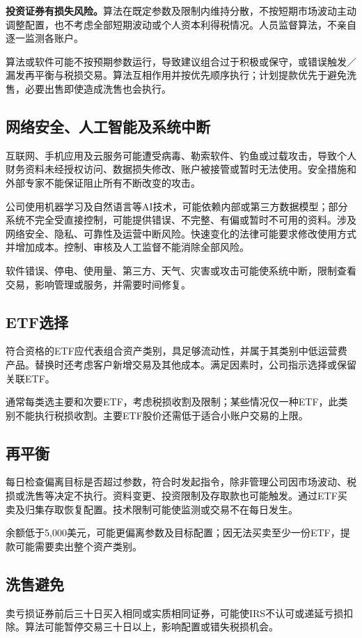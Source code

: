 \documentclass[UTF8,fontset=none,11pt,a4paper]{ctexart}
\begin{document}
\textbf{投资证券有损失风险。}算法在既定参数及限制内维持分散，不按短期市场波动主动调整配置，也不考虑全部短期波动或个人资本利得税情况。人员监督算法，不亲自逐一监\allowbreak\mbox{测各账户。}


算法或软件可能不按预期参数运行，导致建议组合过于积极或保守，或错误触发／漏发再平衡与税损交易。算法互相作用并按优先顺序执行；计划提款优先于避免洗售，必要出售即使造成洗售\allowbreak\mbox{也会执行。}


\subsection*{网络安全、人工智能及系统中断}
互联网、手机应用及云服务可能遭受病毒、勒索软件、钓鱼或过载攻击，导致个人财务资料未经授权访问、数据损失修改、账户被接管或暂时无法使用。安全措施和外部专家不能保证阻止所有不断改\allowbreak\mbox{变的攻击。}


公司使用机器学习及自然语言等AI技术，可能依赖内部或第三方数据模型；部分系统不完全受直接控制，可能提供错误、不完整、有偏或暂时不可用的资料。涉及网络安全、隐私、可靠性及运营中断风险。快速变化的法律可能要求修改使用方式并增加成本。控制、审核及人工监督不能消除\allowbreak\mbox{全部风险。}


软件错误、停电、使用量、第三方、天气、灾害或攻击可能使系统中断，限制查看交易，影响管理或服务，并需要\allowbreak\mbox{时间修复。}


\subsection*{ETF选择}
符合资格的ETF应代表组合资产类别，具足够流动性，并属于其类别中低运营费产品。替换时还考虑客户新增交易及其他成本。满足因素时，公司指示选择或保留关联ETF。


通常每类选主要和次要ETF，考虑税损收割及限制；某些情况仅一种ETF，此类别不能执行税损收割。主要ETF股价还需低于适合小账户交\allowbreak\mbox{易的上限。}


\subsection*{再平衡}
每日检查偏离目标是否超过参数，符合时发起指令，除非管理公司因市场波动、税损或洗售等决定不执行。资料变更、投资限制及存取款也可能触发。通过ETF买卖及归集存取恢复配置。技术限制可能使监测或交易不在\allowbreak\mbox{每日发生。}


余额低于5,000美元，可能更偏离参数及目标配置；因无法买卖至少一份ETF，提款可能需要卖出整个\allowbreak\mbox{资产类别。}


\subsection*{洗售避免}
卖亏损证券前后三十日买入相同或实质相同证券，可能使IRS不认可或递延亏损扣除。算法可能暂停交易三十日以上，影响配置或错失\allowbreak\mbox{税损机会。}
\end{document}
